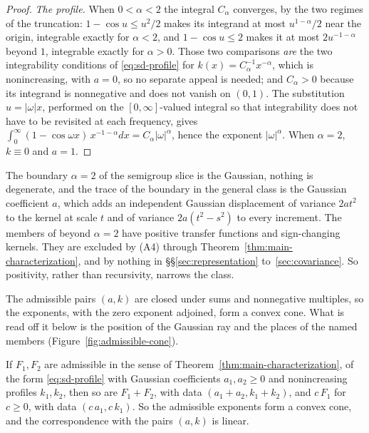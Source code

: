 \begin{proof}
\emph{The profile.} When $0 < \alpha < 2$ the integral $C_\alpha$ converges, by the two regimes
of the truncation: $1 - \cos u \le u^2/2$ makes its integrand at most $u^{1-\alpha}/2$ near the
origin, integrable exactly for $\alpha < 2$, and $1 - \cos u \le 2$ makes it at most
$2u^{-1-\alpha}$ beyond $1$, integrable exactly for $\alpha > 0$. Those two comparisons
\emph{are} the two integrability conditions of \ref{eq:sd-profile} for
$k(x) = C_\alpha^{-1}x^{-\alpha}$, which is nonincreasing, with $a = 0$, so no separate appeal
is needed; and $C_\alpha > 0$ because its integrand is nonnegative and does not vanish on
$(0,1)$. The substitution $u = |\omega|x$, performed on the $[0,\infty]$-valued integral so that
integrability does not have to be revisited at each frequency, gives
$\int_0^\infty (1-\cos\omega x)\,x^{-1-\alpha}dx = C_\alpha|\omega|^\alpha$, hence the exponent
$|\omega|^\alpha$. When $\alpha = 2$, $k \equiv 0$ and $a = 1$.
\end{proof}

\begin{remark}\label{rem:boundary}
The boundary $\alpha = 2$ of the semigroup slice is the Gaussian, nothing is degenerate, and
the trace of the boundary in the general class is the Gaussian coefficient $a$, which adds
an independent Gaussian displacement of variance $2at^2$ to the kernel at scale $t$ and of
variance $2a(t^2 - s^2)$ to every increment. The members of
beyond $\alpha = 2$ have positive transfer functions and sign-changing kernels. They are
excluded by (A4) through Theorem~\ref{thm:main-characterization}, and by nothing in
\S\S\ref{sec:representation} to~\ref{sec:covariance}. So positivity, rather than
recursivity, narrows the class.
\end{remark}

The admissible pairs $(a,k)$ are closed under sums and nonnegative multiples, so the
exponents, with the zero exponent adjoined, form a convex cone. What is read off it below is the position of the Gaussian ray and the
places of the named members (Figure~\ref{fig:admissible-cone}).

\begin{lemma}\label{lem:admissible-cone}
If $F_1, F_2$ are admissible in the sense of Theorem~\ref{thm:main-characterization}, of the
form \ref{eq:sd-profile} with Gaussian coefficients $a_1, a_2 \ge 0$ and nonincreasing profiles
$k_1, k_2$, then so are $F_1 + F_2$, with data $(a_1+a_2, k_1+k_2)$, and $c\,F_1$ for $c \ge 0$,
with data $(c\,a_1, c\,k_1)$. So the admissible exponents form a convex cone, and the
correspondence with the pairs $(a,k)$ is linear.
\end{lemma}

